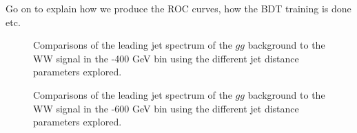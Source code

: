 Go on to explain how we produce the ROC curves, how the BDT training
is done etc.

\begin{figure}
\begin{center}
\caption{Comparisons of the leading jet \pt spectrum of the $gg$
  background to the WW signal in the -400 GeV bin using the
  different \antikt jet distance parameters explored.}
\label{fig:pt300_basics}
\end{center}
\end{figure}

\begin{figure}
\begin{center}
\caption{Comparisons of the leading jet \pt spectrum of the $gg$
  background to the WW signal in the -600 GeV bin using the
  different \antikt jet distance parameters explored.}
\label{fig:pt500_basics}
\end{center}
\end{figure}

